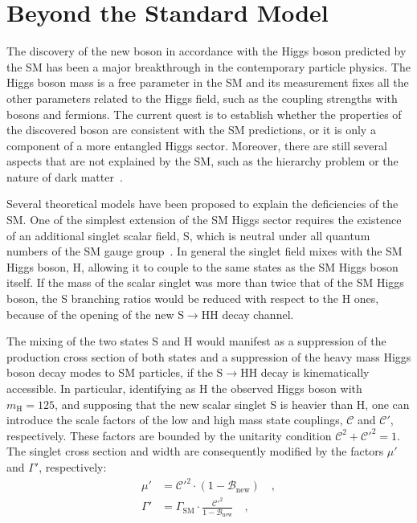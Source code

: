 \section{Beyond the Standard Model}
\label{sec:BSM}

The discovery of the new boson in accordance with the Higgs boson predicted by the SM has been a major breakthrough in the contemporary particle physics. The Higgs boson mass is a free parameter in the SM and its measurement fixes all the other parameters related to the Higgs field, such as the coupling strengths with bosons and fermions. The current quest is to establish whether the properties of the discovered boson are consistent with the SM predictions, or it is only a component of a more entangled Higgs sector. Moreover, there are still several aspects that are not explained by the SM, such as the hierarchy problem or the nature of dark matter~\cite{Langacker:2010zza}.

Several theoretical models have been proposed to explain the deficiencies of the SM. One of the simplest extension of the SM Higgs sector requires the existence of an additional singlet scalar field, S, which is neutral under all quantum numbers of the SM gauge group~\cite{Robens:2015gla}. In general the singlet field mixes with the SM Higgs boson, H, allowing it to couple to the same states as the SM Higgs boson itself. If the mass of the scalar singlet was more than twice that of the SM Higgs boson, the S branching ratios would be reduced with respect to the H ones, because of the opening of the new $\mathrm{S \to HH}$ decay channel.

The mixing of the two states S and H would manifest as a suppression of the production cross section of both states and a suppression of the heavy mass Higgs boson decay modes to SM particles, if the $\mathrm{S \to HH}$ decay is kinematically accessible. In particular, identifying as H the observed Higgs boson with $m_\mathrm{H} = 125$\GeV, and supposing that the new scalar singlet S is heavier than H, one can introduce the scale factors of the low and high mass state couplings, $\mathcal{C}$ and $\mathcal{C'}$, respectively. These factors are bounded by the unitarity condition $\mathcal{C}^2 + \mathcal{C'}^2 = 1$. The singlet cross section and width are consequently modified by the factors $\mu'$ and $\Gamma'$, respectively:
\begin{equation}
\begin{split}
\mu' &= \mathcal{C'}^2 \cdot (1 - \mathcal{B}_\mathrm{new}) \quad ,\\
\Gamma' &= \Gamma_\mathrm{SM} \cdot \frac{\mathcal{C'}^2}{1 - \mathcal{B}_\mathrm{new}} \quad ,
\end{split}
\end{equation}

